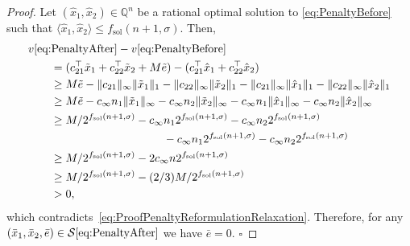 \documentclass[10pt,a4paper]{amsart}
\newcommand{\MacroColor}[1]{#1}
\newcommand{\MyQED}{\mbox{}\hfill$\square$}
\newcommand{\NVariables}{\MacroColor{n}}
\newcommand{\OptSolSet}{\MacroColor{\mathcal{S}}}
\newcommand{\OptValFunc}{\MacroColor{v}}
\newcommand{\ReformPen}{\MacroColor{e}}
\newcommand{\SizeTwo}[2]{\langle#1,#2\rangle}
\newcommand{\SolutionSizeEstimate}{\MacroColor{f_{\mathrm{sol}}}}
\begin{document}
\begin{proof}
Let $(\hat{x}_1, \hat{x}_2) \in \mathbb{Q}^{\NVariables}$ be a rational optimal solution to \eqref{eq:PenaltyBefore} such that $\SizeTwo{\hat{x}_1}{\hat{x}_2} \le \SolutionSizeEstimate(\NVariables + 1, \sigma)$.
Then,
\begin{align}
&
\OptValFunc\eqref{eq:PenaltyAfter}
-
\OptValFunc\eqref{eq:PenaltyBefore}
\notag
\\
&
\qquad
=
(c_{2 1}^{\top} \tilde{x}_1 + c_{2 2}^{\top} \tilde{x}_2 + M \tilde{\ReformPen})
-(c_{2 1}^{\top} \hat{x}_1 + c_{2 2}^{\top} \hat{x}_2)
\notag
\\
&
\qquad
\ge
M \tilde{\ReformPen} 
- \|c_{2 1} \|_\infty \| \tilde{x}_1 \|_1
- \|c_{2 2} \|_\infty \| \tilde{x}_2 \|_1
- \|c_{2 1} \|_\infty \| \hat{x}_1 \|_1
- \|c_{2 2} \|_\infty \| \hat{x}_2 \|_1
\notag
\\
&
\qquad
\ge
M \tilde{\ReformPen} 
- c_\infty \NVariables_1 \| \tilde{x}_1 \|_\infty
- c_\infty \NVariables_2 \| \tilde{x}_2 \|_\infty
- c_\infty \NVariables_1 \| \hat{x}_1 \|_\infty
- c_\infty \NVariables_2 \| \hat{x}_2 \|_\infty
\notag
\\
&
\qquad
\ge
M/2^{\SolutionSizeEstimate(\NVariables + 1, \sigma)}
- c_{\infty} \NVariables_1 2^{\SolutionSizeEstimate(\NVariables + 1, \sigma)}
- c_{\infty} \NVariables_2 2^{\SolutionSizeEstimate(\NVariables + 1, \sigma)}
\notag
\\
& 
\qquad
\qquad
\qquad
\qquad
\qquad
\qquad
-  c_{\infty} \NVariables_1 2^{\SolutionSizeEstimate(\NVariables + 1, \sigma)}
- c_{\infty} \NVariables_2 2^{\SolutionSizeEstimate(\NVariables + 1, \sigma)}
\notag
\\
&
\qquad
\ge
M/2^{\SolutionSizeEstimate(\NVariables + 1, \sigma)}
- 2 c_{\infty} \NVariables 2^{\SolutionSizeEstimate(\NVariables + 1, \sigma)}
\notag
\\
&
\qquad
\ge
M/2^{\SolutionSizeEstimate(\NVariables + 1, \sigma)}
- (2/3) M/2^{\SolutionSizeEstimate(\NVariables + 1, \sigma)}
\notag
\\
&
\qquad
> 0,
\notag
\end{align}
which contradicts~\eqref{eq:ProofPenaltyReformulationRelaxation}.
Therefore, for any $(\bar{x}_1, \bar{x}_2, \bar{\ReformPen}) \in \OptSolSet\eqref{eq:PenaltyAfter}$ we have $\bar{\ReformPen} = 0$.
\MyQED
\end{proof}
\end{document}
